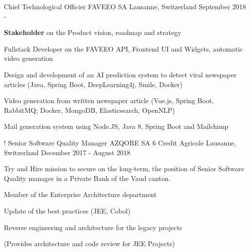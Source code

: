 

\begin{cventries}
    \cventry
    {Chief Technological Officier} %
    {FAVEEO SA} %
    {Lausanne, Switzerland} %
    {September 2018 - } %
    {
        \begin{cvitems} %
            \item{\textbf{Stakeholder} on the Product vision, roadmap and strategy}
            \item{Fullstack Developer on the FAVEEO API, Frontend UI and Widgets, automatic video generation}
            \item{Design and development of an AI prediction system to detect viral newspaper articles (Java, Spring Boot, DeepLearning4j, Smile, Docker)}
            \item{Video generation from written newspaper article (Vue.js, Spring Boot, RabbitMQ; Docker, MongoDB, Elasticsearch, OpenNLP)}
            \item{Mail generation system using Node.JS, Java 8, Spring Boot and Mailchimp}
        \end{cvitems}
    }!
    \cventry
    {Senior Software Quality Manager} %
    {AZQORE SA 6 Credit Agricole} %
    {Lausanne, Switzerland} %
    {December 2017 - August 2018} %
    {
        \begin{cvitems} %
            \item {Try and Hire mission to secure on the long-term, the position of Senior Software Quality manager in a Private Bank of the Vaud canton.}
            \item{Member of the Enterprise Architecture department}
            \item{Update of the best practices (JEE, Cobol)}
            \item{Reverse engineering and architecture for the legacy projects}
            \item(Provides architecture and code review for JEE Projects)

\end{cvitems}}
\end{cventries}
